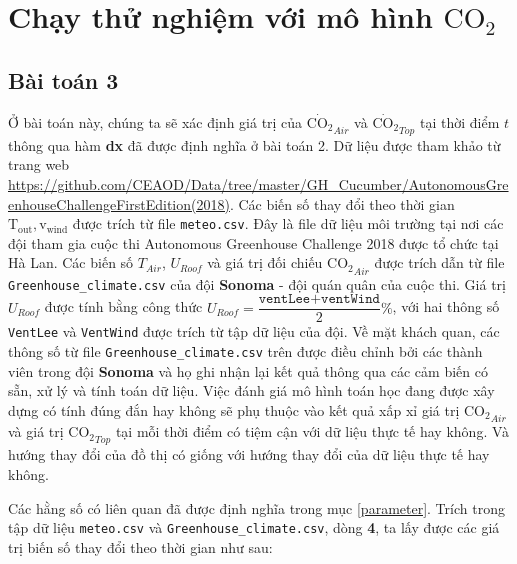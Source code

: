 \documentclass[a4paper]{article}
\begin{document}
\section{Chạy thử nghiệm với mô hình $\mathrm{CO_{2}}$}
\subsection{Bài toán 3}\label{dx}
Ở bài toán này, chúng ta sẽ xác định giá trị của $\dot{\mathrm{CO_{2}}}_{Air}$ và $\dot{\mathrm{CO_{2}}}_{Top}$ tại thời điểm $t$ thông qua hàm \textbf{dx} đã được định nghĩa ở bài toán 2. Dữ liệu được tham khảo từ trang web \url{https://github.com/CEAOD/Data/tree/master/GH_Cucumber/AutonomousGreenhouseChallengeFirstEdition(2018)}. Các biến số thay đổi theo thời gian $\mathrm{T_{out}}, \mathrm{v_{wind}}$ được trích từ file \texttt{meteo.csv}. Đây là file dữ liệu môi trường tại nơi các đội tham gia cuộc thi Autonomous Greenhouse Challenge 2018 được tổ chức tại Hà Lan. Các biến số $T_{Air}$, $U_{Roof}$ và giá trị đối chiếu $\mathrm{CO_{2}}_{Air}$ được trích dẫn từ file \texttt{Greenhouse\_climate.csv} của đội \textbf{Sonoma} - đội quán quân của cuộc thi. Giá trị $U_{Roof}$ được tính bằng công thức $U_{Roof} = \dfrac{\texttt{ventLee+ventWind}}{2}\%$, với hai thông số \texttt{VentLee} và \texttt{VentWind} được trích từ tập dữ liệu của đội. Về mặt khách quan, các thông số từ file \texttt{Greenhouse\_climate.csv} trên được điều chỉnh bởi các thành viên trong đội \textbf{Sonoma} và họ ghi nhận lại kết quả thông qua các cảm biến có sẵn, xử lý và tính toán dữ liệu. Việc đánh giá mô hình toán học đang được xây dựng có tính đúng đắn hay không sẽ phụ thuộc vào kết quả xấp xỉ giá trị $\mathrm{CO_{2}}_{Air}$ và giá trị $\mathrm{CO_{2}}_{Top}$ tại mỗi thời điểm có tiệm cận với dữ liệu thực tế hay không. Và hướng thay đổi của đồ thị có giống với hướng thay đổi của dữ liệu thực tế hay không.\par

Các hằng số có liên quan đã được định nghĩa trong mục \ref{parameter}. Trích trong tập dữ liệu \texttt{meteo.csv} và \texttt{Greenhouse\_climate.csv}, dòng \textbf{4}, ta lấy được các giá trị biến số thay đổi theo thời gian như sau:
\end{document}
